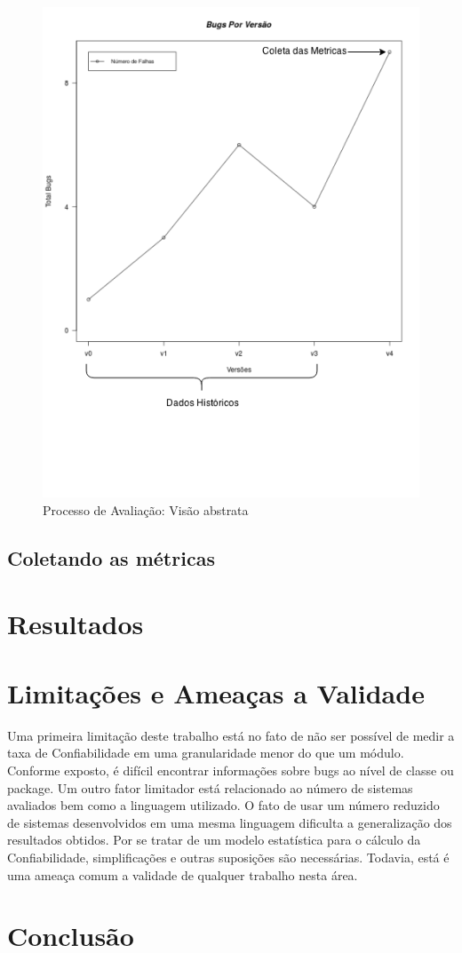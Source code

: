 \documentclass[12pt]{article}
\begin{document}
\begin{figure}[htbp]
\centering
\includegraphics[width=.80\textwidth]{./img/projeto_mes_avaliacao.png}
\caption{Processo de Avaliação: Visão abstrata}
\label{fig:avalicao}
\end{figure}

\subsection{Coletando as métricas}
\label{subsec:analise_coleta_metricas}

\section{Resultados}
\label{sec:resultados}
\section{Limitações e Ameaças a Validade}
\label{sec:limitacoes}

Uma primeira limitação deste trabalho está no fato de não ser possível de medir
a taxa de Confiabilidade em uma granularidade menor do que um módulo. Conforme
exposto, é difícil encontrar informações sobre bugs ao nível de classe ou
package. Um outro fator limitador está relacionado ao número de sistemas
avaliados bem como a linguagem utilizado. O fato de usar um número reduzido de
sistemas desenvolvidos em uma mesma linguagem dificulta a generalização dos
resultados obtidos. Por se tratar de um modelo estatística para o cálculo da
Confiabilidade, simplificações e outras suposições são necessárias. Todavia,
está é uma ameaça comum a validade de qualquer trabalho nesta área.

\section{Conclusão}
\label{sec:conclusao}



\end{document}
